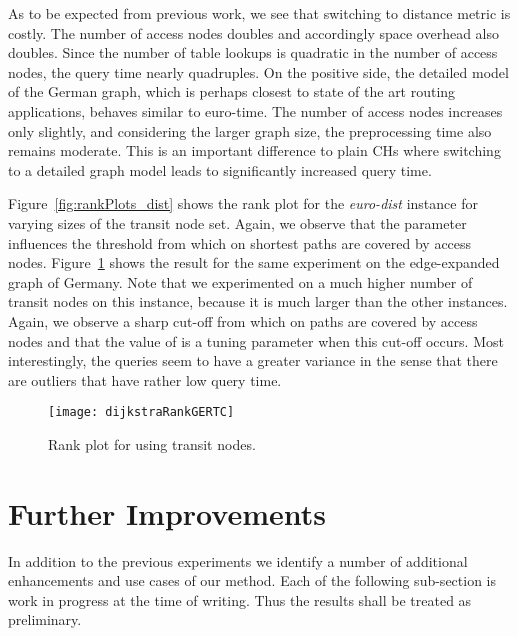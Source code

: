 \documentclass{llncs}
\begin{document}
As to be expected from previous work,
we see that switching to distance metric is costly. 
The number of access nodes doubles  and accordingly space overhead also doubles. 
Since the number of table lookups is quadratic in the number of access nodes, the query time nearly quadruples.
On the positive side, the detailed model of the German graph, which is perhaps closest to state of the art routing applications, behaves similar to euro-time. 
The number of access nodes increases only slightly, and considering the larger graph size, the preprocessing time also remains moderate. 
This is an important difference to plain CHs where switching to a detailed graph model leads to significantly increased query time. 

Figure~\ref{fig:rankPlots_dist} shows the rank plot for the \emph{euro-dist} instance for varying sizes of the transit node set.
Again, we observe that the parameter influences the threshold from which on shortest paths are covered by access nodes.
Figure~\ref{fig:rankPlots_ger} shows the result for the same experiment on the edge-expanded graph of Germany.
Note that we experimented on a much higher number of transit nodes on this instance, because it is much larger than the other instances.
Again, we observe a sharp cut-off from which on paths are covered by access nodes and that the value of  is a tuning parameter when this cut-off occurs.
Most interestingly, the queries seem to have a greater variance in the sense that there are outliers that have rather low query time.
\begin{figure}[t!]
\centering
	\texttt{[image: dijkstraRankGERTC]}
	\caption{Rank plot for using  transit nodes.}
\label{fig:rankPlots_ger}
\end{figure}

\section{Further Improvements}

In addition to the previous experiments we identify a number of additional enhancements and use cases of our method.
Each of the following sub-section is work in progress at the time of writing.
Thus the results shall be treated as preliminary.
\end{document}
